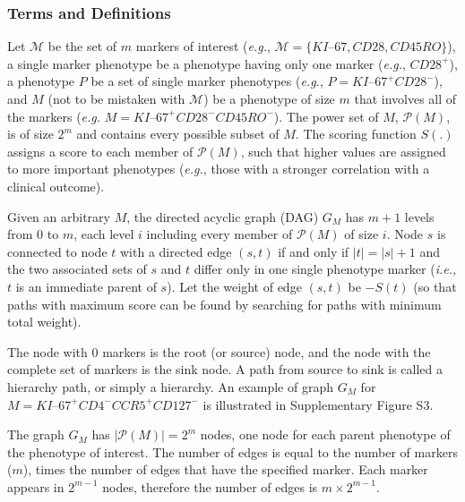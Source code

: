 \subsubsection{Terms and Definitions}

Let $\mathcal{M}$ be the set of $m$ markers of interest (\emph{e.g.}, $\mathcal{M}=\{KI\mbox{--}67,CD28,CD45RO\}$), a
single marker phenotype be a phenotype having only one marker (\emph{e.g.}, $CD28^+$), a phenotype $P$ be a set of single
marker phenotypes (\emph{e.g.}, $P=KI\mbox{--}67^+CD28^-$), and $M$ (not to be mistaken with $\mathcal{M}$) be a phenotype of size $m$ that involves all of the
markers (\emph{e.g.} $M=KI\mbox{--}67^+CD28^-CD45RO^-$).  The power set of $M$, $\mathcal{P}(M)$, is of size $2^m$ and contains every possible subset of $M$.  
The scoring function $S(.)$ assigns a score to each member of $\mathcal{P}(M)$, such that higher values are assigned to more important phenotypes (\emph{e.g.}, those with a stronger correlation with a clinical outcome). 

Given an arbitrary $M$, the  directed acyclic  graph (DAG)  $G_M$ has $m + 1$ levels from $0$ to $m$, each level $i$ including every
member of $\mathcal{P}(M)$ of size $i$.  Node $s$ is connected to node $t$ with a directed edge $(s,t)$ if and only if
$|t|=|s|+1$ and the two associated sets of $s$ and $t$ differ only in one single phenotype marker (\emph{i.e.,} $t$ is
an immediate parent of $s$).  
Let the weight of edge $(s,t)$ be $-S(t)$ (so that paths with maximum score can be found by searching for paths with minimum total weight). 


The node with $0$ markers is the root (or source) node, and the node with the complete set of markers is the sink node. 
A path from source to sink is called a hierarchy path, or simply a hierarchy. 
An example of graph $G_M$ for $M = KI\mbox{--}67^+CD4^-CCR5^+CD127^-$ is
illustrated in Supplementary Figure S3.

The graph $G_M$ has $|\mathcal{P}(M)|=2^m$ nodes, one node for each parent phenotype of the phenotype of interest. 
The number of edges is equal to the number of markers ($m$), times the number of edges that have the specified marker.  
Each marker appears in $2^{m-1}$ nodes, therefore the number of edges is $m \times 2^{m-1}$. 


